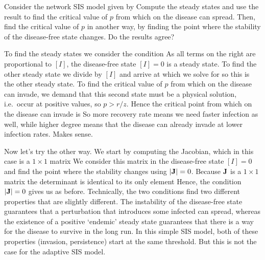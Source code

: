 Consider the network SIS model given by 
Compute the steady states and use the result to find the critical value of $p$ from which on the disease can spread. Then, find the critical value of $p$ in another way, by finding the point where the stability of the disease-free state changes. Do the results agree?

\solution
To find the steady states we consider the condition 
As all terms on the right are proportional to $[I]$, the disease-free state $[I]=0$ is a steady state. To find the other steady state we divide by $[I]$ and arrive at 
which we solve for 
so this is the other steady state. To find the critical value of $p$ from which on the disease can invade, we demand that this second state must be a physical solution, i.e.~occur at positive values,
so $p>r/z$. Hence the critical point from which on the disease can invade is
So more recovery rate means we need faster infection as well, while higher degree means that the disease can already invade at lower infection rates. Makes sense. 

Now let's try the other way. We start by computing the Jacobian, which in this case is a $1 \times 1$ matrix 
We consider this matrix in the disease-free state $[I] = 0$ and find the point where the stability changes using $|{\bf J}|=0$. Because $\bf J$ is a $1\times 1$ matrix the determinant is identical to its only element
Hence, the condition $|{\bf J}|=0$ gives us 
as before. Technically, the two conditions find two different properties that are slightly different. The instability of the disease-free state guarantees that a perturbation that introduces some infected can spread, whereas the existence of a positive `endemic' steady state guarantees that there is a way for the disease to survive in the long run. In this simple SIS model, both of these properties (invasion, persistence) start at the same threshold. But this is not the case for the adaptive SIS model. 






